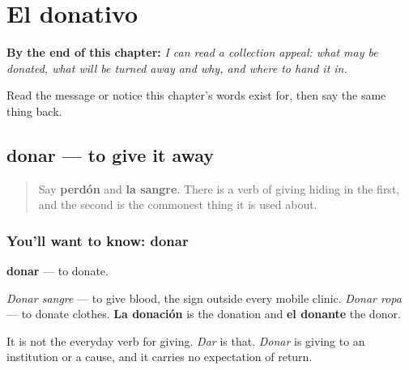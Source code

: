 
\chapter{El donativo}
\label{ch:es-donar}

\begin{chapteropening}
\textbf{By the end of this chapter:} \emph{I can read a collection appeal: what may be donated, what will be turned away and why, and where to hand it in.}

Read the message or notice this chapter's words exist for, then say the same thing back.
\end{chapteropening}

\section[donar]{donar — to give it away}

\label{lesson:ES-C461-donar}



\begin{quote}
Say \textbf{perdón} and \textbf{la sangre}. There is a verb of giving hiding in the first, and the second is the commonest thing it is used about.
\end{quote}

\subsection*{You'll want to know: donar}
\textbf{donar} — to donate.

\emph{Donar sangre} — to give blood, the sign outside every mobile clinic. \emph{Donar ropa} — to donate clothes. \textbf{La donación} is the donation and \textbf{el donante} the donor.

It is not the everyday verb for giving. \emph{Dar} is that. \emph{Donar} is giving to an institution or a cause, and it carries no expectation of return.

